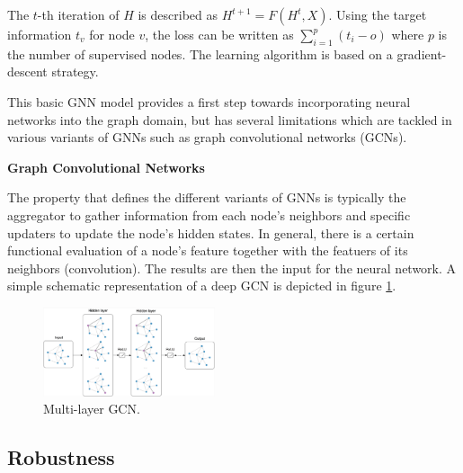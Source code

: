 \documentclass[a4paper,preprint]{sig-alternate}
\begin{document}
The $t$-th iteration of $H$ is described as $H^{t + 1} = F(H^t, X)$.
Using the target information $t_v$ for node $v$, the loss can be written as $\sum_{i=1}^p (t_i - o)$
where $p$ is the number of supervised nodes. The learning algorithm is based on a gradient-descent strategy.\newline

\vfill
\pagebreak

This basic GNN model provides a first step towards incorporating neural networks into the graph domain, 
but has several limitations \cite{article} which are tackled in various variants of GNNs such as graph convolutional networks (GCNs).\newline

\textbf{Graph Convolutional Networks}\newline

The property that defines the different variants of GNNs is typically the aggregator to gather information from each node's neighbors
and specific updaters to update the node's hidden states. \cite{zhou2019graph} In general, there is a certain functional evaluation of
a node's feature together with the featuers of its neighbors (convolution). The results are then the input for the neural network.
A simple schematic representation of a deep GCN is depicted in figure \ref{fig:gcn}.
\begin{figure}[h]
    \centering
    \includegraphics[width=0.45\textwidth]{img/gcn.png}
    \caption{Multi-layer GCN. \cite{kipf2016semi}}
    \label{fig:gcn}
\end{figure}

\subsection{Robustness}
\end{document}
